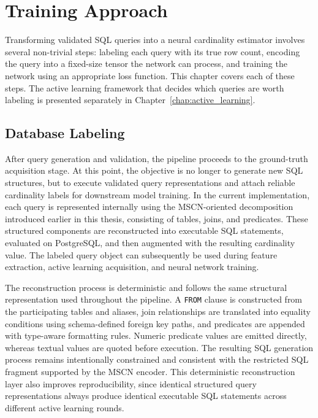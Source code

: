 \chapter{Training Approach}
\label{chap:training_approach}
\pagestyle{plain}

Transforming validated SQL queries into a neural cardinality estimator involves several non-trivial steps: labeling each query with its true row count, encoding the query into a fixed-size tensor the network can process, and training the network using an appropriate loss function. This chapter covers each of these steps. The active learning framework that decides which queries are worth labeling is presented separately in Chapter~\ref{chap:active_learning}.

\section{Database Labeling}

After query generation and validation, the pipeline proceeds to the ground-truth acquisition stage. At this point, the objective is no longer to generate new SQL structures, but to execute validated query representations and attach reliable cardinality labels for downstream model training. In the current implementation, each query is represented internally using the MSCN-oriented decomposition introduced earlier in this thesis, consisting of tables, joins, and predicates. These structured components are reconstructed into executable SQL statements, evaluated on PostgreSQL, and then augmented with the resulting cardinality value. The labeled query object can subsequently be used during feature extraction, active learning acquisition, and neural network training.

The reconstruction process is deterministic and follows the same structural representation used throughout the pipeline. A \texttt{FROM} clause is constructed from the participating tables and aliases, join relationships are translated into equality conditions using schema-defined foreign key paths, and predicates are appended with type-aware formatting rules. Numeric predicate values are emitted directly, whereas textual values are quoted before execution. The resulting SQL generation process remains intentionally constrained and consistent with the restricted SQL fragment supported by the MSCN encoder. This deterministic reconstruction layer also improves reproducibility, since identical structured query representations always produce identical executable SQL statements across different active learning rounds.

